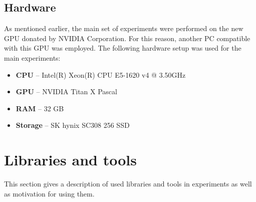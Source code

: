     \subsection{Hardware}
    \label{sec:main-hw}
    As mentioned earlier, the main set of experiments were performed on the new GPU donated by NVIDIA Corporation. For this reason, another PC compatible with this GPU was employed. The following hardware setup was used for the main experiments:
    
    \begin{itemize}
        \item \textbf{CPU} -- Intel(R) Xeon(R) CPU E5-1620 v4 @ 3.50GHz
        \item \textbf{GPU} -- NVIDIA Titan X Pascal
        \item \textbf{RAM} -- 32 GB
        \item \textbf{Storage} -- SK hynix SC308 256 SSD
    \end{itemize}

    
\section{Libraries and tools}
This section gives a description of used libraries and tools in experiments as well as motivation for using them.

